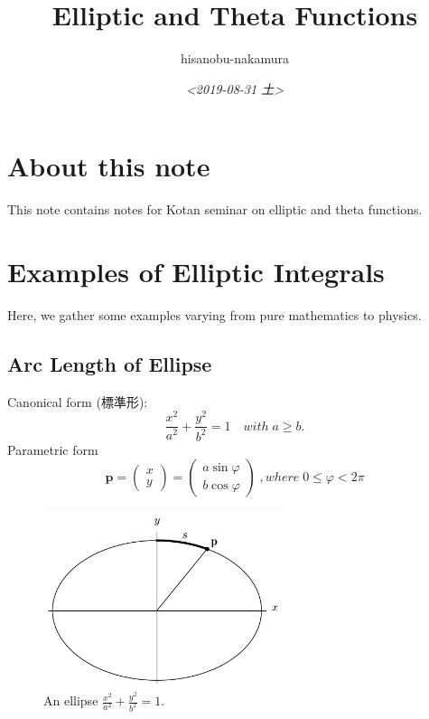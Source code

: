 \documentclass{article}
\author{hisanobu-nakamura}
\date{\textit{<2019-08-31 土>}}
\title{Elliptic and Theta Functions}
\begin{document}
\maketitle
\tableofcontents


\section{About this note}
\label{sec-1}
This note contains notes for Kotan seminar on elliptic and theta functions.

\section{Examples of Elliptic Integrals}
\label{sec-2}
Here, we gather some examples varying from pure mathematics to physics.
\subsection{Arc Length of Ellipse}
\label{sec-2-1}
Canonical form (標準形):
\begin{equation}
\frac{x^{2}}{a^{2}} +\frac{y^{2}}{b^{2}}=1 \quad with \; a \ge b.
\end{equation}
Parametric form
\begin{equation}
\mathbf{p} =\left(
\begin{array}{c}
 x \\
 y
\end{array} \right)
=\left(
\begin{array}{c}
 a \sin{\varphi} \\
 b \cos{\varphi}
\end{array} \right)
\;, where \; 0 \le \varphi < 2 \pi
\end{equation}

\begin{figure}[htb]
\centering
\includegraphics[width=70mm]{./ellipse_generic.png}
\caption{\label{fig:generic_ellipse}An ellipse $\frac{x^{2}}{a^{2}} +\frac{y^{2}}{b^{2}}=1$.}
\end{figure} \\
\end{document}
